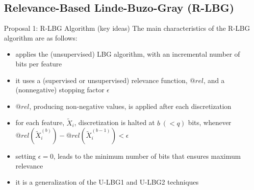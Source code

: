 \documentclass{beamer}
\begin{document}
\subsection[Relevance-Based Linde-Buzo-Gray (R-LBG)]{Relevance-Based Linde-Buzo-Gray (R-LBG)}
\begin{frame}{Proposal 1: R-LBG Algorithm (key ideas)}
The main characteristics of the R-LBG algorithm are as follows:
\begin{itemize}
  \vfill
	\item applies the (unsupervised) LBG algorithm, with an
	incremental number of bits per feature

  \vfill
	\item it uses a (supervised or unsupervised) relevance function, $@rel$,
	and a (nonnegative) stopping factor $\epsilon$
	
	\vfill
	\item $@rel$, producing non-negative values, is applied after each discretization
	
	\vfill
	\item for each feature, $\widetilde{X}_i$, discretization is halted at $b \ (< q)$ bits, whenever
	$@rel(\widetilde{X}_i^{(b)}) - @rel(\widetilde{X}_i^{(b-1)}) < \epsilon$
	
	\vfill
	\item setting $\epsilon=0$, leads to the minimum number of bits
	that ensures maximum relevance	
	
	\vfill
	\item it is a generalization of the U-LBG1 and U-LBG2 techniques
	
\end{itemize}
\end{frame}
\end{document}
